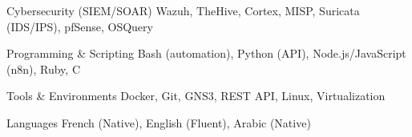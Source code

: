 
\begin{cvskills}

    \cvskill
    {Cybersecurity (SIEM/SOAR)} %
    {Wazuh, TheHive, Cortex, MISP, Suricata (IDS/IPS), pfSense, OSQuery} %

    \cvskill
    {Programming \& Scripting} %
    {Bash (automation), Python (API), Node.js/JavaScript (n8n), Ruby, C} %

    \cvskill
    {Tools \& Environments} %
    {Docker, Git, GNS3, REST API, Linux, Virtualization} %

    \cvskill
    {Languages} %
    {French (Native), English (Fluent), Arabic (Native)} %

\end{cvskills}
